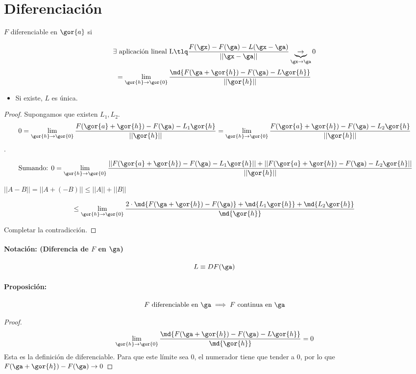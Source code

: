 
\section{Diferenciación}

\begin{defn}
 $F$ diferenciable en $\gor{a}$ si 
 
 $$\exists \text{ aplicación lineal L} \tlq \frac{F(\gx)-F(\ga)-L(\gx-\ga)}{||\gx-\ga||} \underbrace{\rightarrow}_{\gx\rightarrow\ga} 0$$
$$ = \lim_{\gor{h} \rightarrow \gor{0}} \frac{\md{F(\ga+\gor{h}) - F(\ga) - L\gor{h}}}{||\gor{h}||}$$

\end{defn}


\obs
\begin{itemize}
\item Si existe, $L$ es única.
\end{itemize}

\begin{proof}
Supongamos que existen $L_1,L_2$.
\[0=\lim_{\gor{h} \rightarrow \gor{0}} \frac{F(\gor{a}+\gor{h}) - F(\ga)-L_1\gor{h}}{||\gor{h}||} = \lim_{\gor{h} \rightarrow \gor{0}} \frac{F(\gor{a}+\gor{h}) - F(\ga)-L_2\gor{h}}{||\gor{h}||}\].

$$\text{ Sumando: } 0 = \lim_{\gor{h} \rightarrow \gor{0}} \frac{||F(\gor{a}+\gor{h}) - F(\ga)-L_1\gor{h}|| + ||F(\gor{a}+\gor{h}) - F(\ga) -L_2\gor{h}||}{||\gor{h}||}$$

\obs $||A-B|| = ||A+(-B)|| \leq ||A||+||B||$

$$\leq \lim_{\gor{h} \rightarrow \gor{0}} \frac{2\cdot\md{F(\ga + \gor{h}) - F(\ga)} + \md{L_1\gor{h}} + \md{L_2\gor{h}}}{\md{\gor{h}}}$$

Completar la contradicción.
\end{proof}

\paragraph{Notación: (Diferencia de $F$ en $\ga$)}

$$L\equiv DF(\ga)$$ 

\paragraph{Proposición:}
$$F \text{ diferenciable en } \ga \implies F \text{ continua en } \ga$$
\begin{proof}
 $$\lim_{\gor{h} \rightarrow \gor{0}} \frac{\md{F(\ga+\gor{h}) - F(\ga) - L\gor{h}}}{\md{\gor{h}}} = 0$$
 Esta es la definición de diferenciable. Para que este límite sea 0, el numerador tiene que tender a 0, por lo que $F(\ga+\gor{h}) - F(\ga) \rightarrow 0$
\end{proof}

